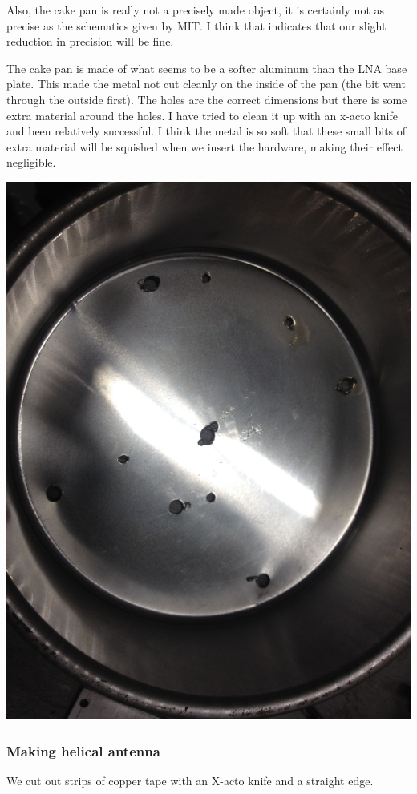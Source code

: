 \documentclass[11pt]{article} %
\begin{document}
Also, the cake pan is really not a precisely made object, it is certainly not as precise as the schematics given by MIT. I think that indicates that our slight reduction in precision will be fine.

The cake pan is made of what seems to be a softer aluminum than the LNA base plate. This made the metal not cut cleanly on the inside of the pan (the bit went through the outside first). The holes are the correct dimensions but there is some extra material around the holes. I have tried to clean it up with an x-acto knife and been relatively successful. I think the metal is so soft that these small bits of extra material will be squished when we insert the hardware, making their effect negligible. 

\begin{center}
\includegraphics[scale=0.12]{feed/08.jpeg}
\end{center}

\subsubsection{Making helical antenna}
We cut out strips of copper tape with an X-acto knife and a straight edge. 
\end{document}
